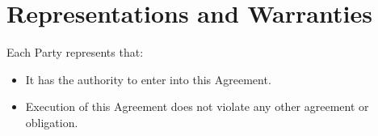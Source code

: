 
\section{Representations and Warranties}
\label{sec:warranty}

Each Party represents that:
\begin{itemize}
  \item It has the authority to enter into this Agreement.
  \item Execution of this Agreement does not violate any other agreement or obligation.
\end{itemize}


